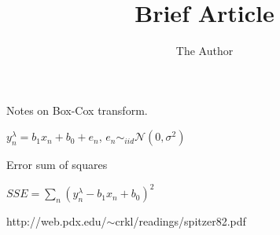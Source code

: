 \documentclass[11pt]{amsart}
\title{Brief Article}
\author{The Author}
\begin{document}
\maketitle

Notes on Box-Cox transform.

$y_n^\lambda = b_1x_n + b_0 + e_n$, $e_n \sim _{iid} \mathcal{N}(0,\sigma^2)$

Error sum of squares

$SSE = \sum_n (y_n^\lambda - b_1x_n + b_0)^2$


{http://web.pdx.edu/$\sim$crkl/readings/spitzer82.pdf}
\end{document}
